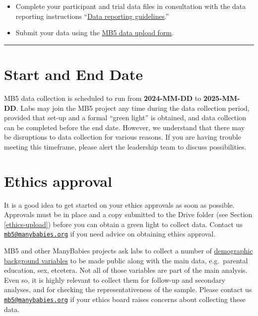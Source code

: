 \documentclass[
]{book}
\providecommand{\tightlist}{%
  \setlength{\itemsep}{0pt}\setlength{\parskip}{0pt}}
\begin{document}
\begin{itemize}
  \begin{itemize}
  \tightlist
  \item
    Complete your participant and trial data files in consultation with the data reporting instructions ``\hyperref[data-reporting-guidelines]{Data reporting guidelines}.''
  \item
    Submit your data using the \href{https://docs.google.com/forms/d/e/1FAIpQLSdFYk-gb4yjRYLjSTP1_BVaW-3vLkpJClLoY2BOGDGfIVE5ww/viewform?usp=sf_link}{MB5 data upload form}.
  \end{itemize}
\end{itemize}

\begin{center}\rule{0.5\linewidth}{0.5pt}\end{center}

\section{Start and End Date}\label{start-and-end-date}

MB5 data collection is scheduled to run from \textbf{2024-MM-DD} to \textbf{2025-MM-DD}. Labs may join the MB5 project any time during the data collection period, provided that set-up and a formal ``green light'' is obtained, and data collection can be completed before the end date. However, we understand that there may be disruptions to data collection for various reasons. If you are having trouble meeting this timeframe, please alert the leadership team to discuss possibilities.

\section{Ethics approval}\label{ethics-approval}

It is a good idea to get started on your ethics approvals as soon as possible. Approvals must be in place and a copy submitted to the Drive folder (see Section \ref{ethics-upload}) before you can obtain a green light to collect data. Contact us \href{mailto:mb5@manybabies.org}{\nolinkurl{mb5@manybabies.org}} if you need advice on obtaining ethics approval.

MB5 and other ManyBabies projects ask labs to collect a number of \href{ADD\%20LINK\%20TO\%20PARTICIPANTS\%20SECTION}{demographic background variables} to be made public along with the main data, e.g.~parental education, sex, etcetera. Not all of those variables are part of the main analysis. Even so, it is highly relevant to collect them for follow-up and secondary analyses, and for checking the representativeness of the sample. Please contact us \href{mailto:mb5@manybabies.org}{\nolinkurl{mb5@manybabies.org}} if your ethics board raises concerns about collecting these data.
\end{document}
